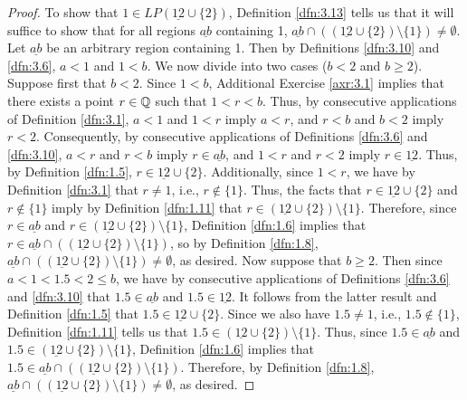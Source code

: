 \documentclass[../main.tex]{subfiles}
\begin{document}
\begin{exercise}
\begin{proof}
        To show that $1\in LP(\underline{12}\cup\{2\})$, Definition \ref{dfn:3.13} tells us that it will suffice to show that for all regions $\underline{ab}$ containing 1, $\underline{ab}\cap((\underline{12}\cup\{2\})\setminus\{1\})\neq\emptyset$. Let $\underline{ab}$ be an arbitrary region containing 1. Then by Definitions \ref{dfn:3.10} and \ref{dfn:3.6}, $a<1$ and $1<b$. We now divide into two cases ($b<2$ and $b\geq 2$). Suppose first that $b<2$. Since $1<b$, Additional Exercise \ref{axr:3.1} implies that there exists a point $r\in\mathbb{Q}$ such that $1<r<b$. Thus, by consecutive applications of Definition \ref{dfn:3.1}, $a<1$ and $1<r$ imply $a<r$, and $r<b$ and $b<2$ imply $r<2$. Consequently, by consecutive applications of Definitions \ref{dfn:3.6} and \ref{dfn:3.10}, $a<r$ and $r<b$ imply $r\in\underline{ab}$, and $1<r$ and $r<2$ imply $r\in\underline{12}$. Thus, by Definition \ref{dfn:1.5}, $r\in\underline{12}\cup\{2\}$. Additionally, since $1<r$, we have by Definition \ref{dfn:3.1} that $r\neq 1$, i.e., $r\notin\{1\}$. Thus, the facts that $r\in\underline{12}\cup\{2\}$ and $r\notin\{1\}$ imply by Definition \ref{dfn:1.11} that $r\in(\underline{12}\cup\{2\})\setminus\{1\}$. Therefore, since $r\in\underline{ab}$ and $r\in(\underline{12}\cup\{2\})\setminus\{1\}$, Definition \ref{dfn:1.6} implies that $r\in\underline{ab}\cap((\underline{12}\cup\{2\})\setminus\{1\})$, so by Definition \ref{dfn:1.8}, $\underline{ab}\cap((\underline{12}\cup\{2\})\setminus\{1\})\neq\emptyset$, as desired. Now suppose that $b\geq 2$. Then since $a<1<1.5<2\leq b$, we have by consecutive applications of Definitions \ref{dfn:3.6} and \ref{dfn:3.10} that $1.5\in\underline{ab}$ and $1.5\in\underline{12}$. It follows from the latter result and Definition \ref{dfn:1.5} that $1.5\in\underline{12}\cup\{2\}$. Since we also have $1.5\neq 1$, i.e., $1.5\notin\{1\}$, Definition \ref{dfn:1.11} tells us that $1.5\in(\underline{12}\cup\{2\})\setminus\{1\}$. Thus, since $1.5\in\underline{ab}$ and $1.5\in(\underline{12}\cup\{2\})\setminus\{1\}$, Definition \ref{dfn:1.6} implies that $1.5\in\underline{ab}\cap((\underline{12}\cup\{2\})\setminus\{1\})$. Therefore, by Definition \ref{dfn:1.8}, $\underline{ab}\cap((\underline{12}\cup\{2\})\setminus\{1\})\neq\emptyset$, as desired.\par\smallskip

\end{proof}
\end{exercise}
\end{document}
